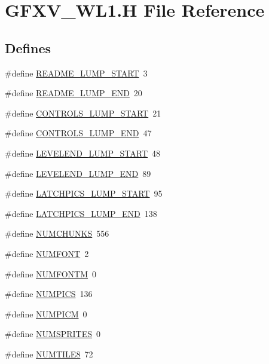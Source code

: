 \hypertarget{GFXV__WL1_8H}{
\section{GFXV\_\-WL1.H File Reference}
\label{GFXV__WL1_8H}
}
\subsection*{Defines}
\begin{DoxyCompactItemize}
\item 
\#define \hyperlink{GFXV__WL1_8H_af1b7fca71ee9337c9dbf43d0949aa105}{README\_\-LUMP\_\-START}~3
\item 
\#define \hyperlink{GFXV__WL1_8H_aecaa7957af595ae525e60cc37dfcf3da}{README\_\-LUMP\_\-END}~20
\item 
\#define \hyperlink{GFXV__WL1_8H_adc808f8c4862206753bc6b22a20de529}{CONTROLS\_\-LUMP\_\-START}~21
\item 
\#define \hyperlink{GFXV__WL1_8H_a227d962ff8d8d1d9a0f31a2d7b35f04d}{CONTROLS\_\-LUMP\_\-END}~47
\item 
\#define \hyperlink{GFXV__WL1_8H_a1895eb960cb12bb7b49bf322e79d6c80}{LEVELEND\_\-LUMP\_\-START}~48
\item 
\#define \hyperlink{GFXV__WL1_8H_a01e5f4d5f8e05beb4315b9ad907e06e7}{LEVELEND\_\-LUMP\_\-END}~89
\item 
\#define \hyperlink{GFXV__WL1_8H_a88207d485bad504249067e714794e823}{LATCHPICS\_\-LUMP\_\-START}~95
\item 
\#define \hyperlink{GFXV__WL1_8H_a366d7af9e92d0a7d4ee631d44c4ecbf7}{LATCHPICS\_\-LUMP\_\-END}~138
\item 
\#define \hyperlink{GFXV__WL1_8H_a06c8b188cc3cdd25a5451beeefddfa66}{NUMCHUNKS}~556
\item 
\#define \hyperlink{GFXV__WL1_8H_a7686ac8ed1dbf71ebee2b4711dae0edd}{NUMFONT}~2
\item 
\#define \hyperlink{GFXV__WL1_8H_afd7a523b060f425fd737a94c044892ac}{NUMFONTM}~0
\item 
\#define \hyperlink{GFXV__WL1_8H_a437727f0f1480aff6a1437f8881e2241}{NUMPICS}~136
\item 
\#define \hyperlink{GFXV__WL1_8H_a2eb878497ab6b2a4f80015a218f38c8f}{NUMPICM}~0
\item 
\#define \hyperlink{GFXV__WL1_8H_ac7e5f97c96cc0101c6f998c7010813a3}{NUMSPRITES}~0
\item 
\#define \hyperlink{GFXV__WL1_8H_a1ad83311a1b6300dcac06636eb1d03b4}{NUMTILE8}~72
\item 

\end{DoxyCompactItemize}
